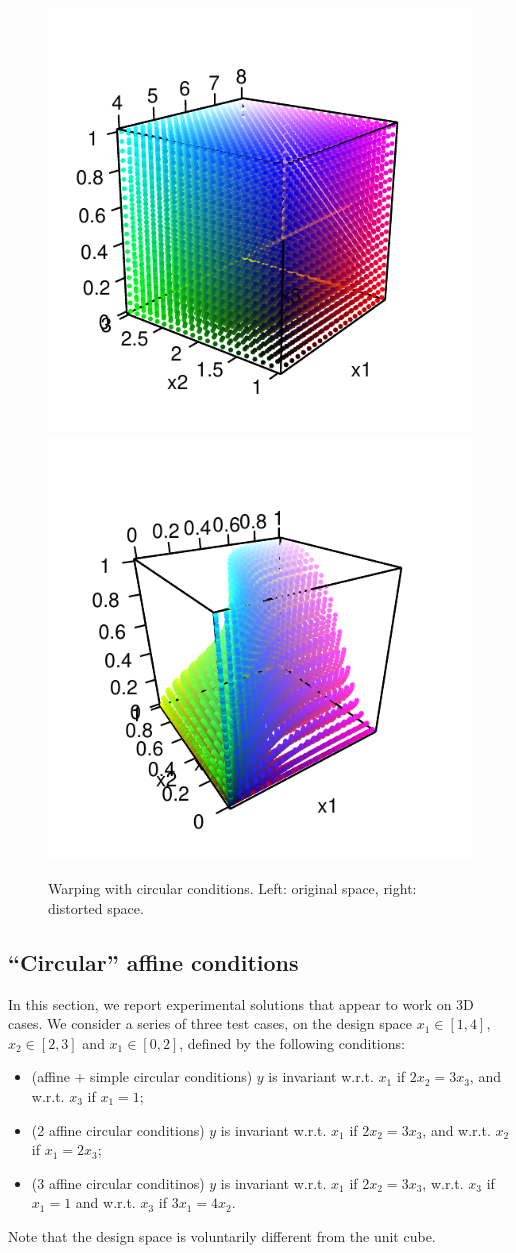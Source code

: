 \documentclass[a4paper,10pt]{article}
\begin{document}
 \begin{figure}[!ht]
 \centering
 \includegraphics[width=.4\textwidth]{def3Dcirc1.pdf}
 \includegraphics[width=.4\textwidth]{def3Dcirc2.pdf}
 \caption{Warping with circular conditions. Left: original space, right: distorted space.}\label{fig:def3Dcirc}
\end{figure}

\subsection{``Circular'' affine conditions}
In this section, we report experimental solutions that appear to work on 3D cases.
We consider a series of three test cases, on the design space $x_1 \in [1,4]$, $x_2 \in [2,3]$ and $x_1 \in [0,2]$,
defined by the following conditions:
\begin{itemize}
 \item (affine + simple circular conditions) $y$ is invariant w.r.t. $x_1$ if $2 x_2=3 x_3$, and  w.r.t.  $x_3$ if $x_1=1$;
 \item (2 affine circular conditions) $y$ is invariant w.r.t. $x_1$ if $2 x_2=3 x_3$, and  w.r.t.  $x_2$ if $x_1=2 x_3$;
 \item (3 affine circular conditinos) $y$ is invariant w.r.t. $x_1$ if $2 x_2=3 x_3$, w.r.t.  $x_3$ if $x_1=1$ and w.r.t. $x_3$ if $3 x_1=4 x_2$.
\end{itemize}
Note that the design space is voluntarily different from the unit cube.
\end{document}
